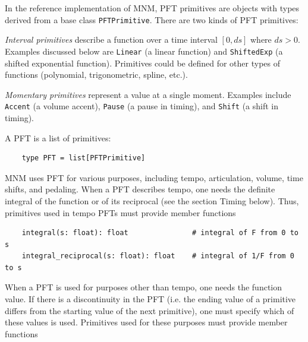 \documentclass[letterpaper, 12pt]{article}
\begin{document}
In the reference implementation of MNM,
PFT primitives are objects with types derived from a base class \texttt{PFTPrimitive}.
There are two kinds of PFT primitives:

\textit{Interval primitives}
describe a function over a time interval $ [0, ds] $ where $ ds > 0 $.
Examples discussed below are
\texttt{Linear} (a linear function) and
\texttt{ShiftedExp} (a shifted exponential function).
Primitives could be defined for other types of functions
(polynomial, trigonometric, spline, etc.).

\textit{Momentary primitives} represent a value at a single moment.
Examples include
\texttt{Accent} (a volume accent),
\texttt{Pause} (a pause in timing), and
\texttt{Shift} (a shift in timing).

A PFT is a list of primitives:
\begin{small}\begin{singlespace}\vspace{-18px}\begin{verbatim}
    type PFT = list[PFTPrimitive]
\end{verbatim}\end{singlespace}\end{small}\vspace{-18px}\noindent

MNM uses PFT for various purposes, including tempo, articulation,
volume, time shifts, and pedaling.
When a PFT describes tempo, one needs
the definite integral of the function or of its reciprocal
(see the section Timing below).
Thus, primitives used in tempo PFTs must provide member functions
\begin{small}\begin{singlespace}\vspace{-18px}\begin{verbatim}
    integral(s: float): float               # integral of F from 0 to s
    integral_reciprocal(s: float): float    # integral of 1/F from 0 to s
\end{verbatim}\end{singlespace}\end{small}\vspace{-18px}\noindent

When a PFT is used for purposes other than tempo,
one needs the function value.
If there is a discontinuity in the PFT
(i.e. the ending value of a primitive differs
from the starting value of the next primitive),
one must specify which of these values is used.
Primitives used for these purposes must provide member functions
\end{document}
